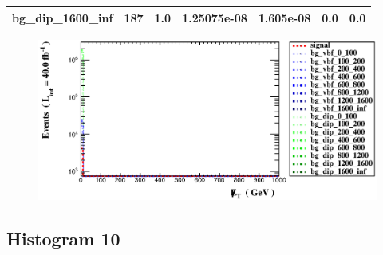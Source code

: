 \documentclass[a4paper, 10pt]{article}
\begin{document}
\begin{table}[H]
\begin{center}
\begin{tabular}{|m{23.0mm}|m{23.0mm}|m{18.0mm}|m{19.0mm}|m{19.0mm}|m{19.0mm}|m{19.0mm}|}
      \hline
      {\cellcolor{white}         bg\_dip\_1600\_inf}& {\cellcolor{white}         187}& {\cellcolor{white}         1.0}& {\cellcolor{white}         1.25075e-08}& {\cellcolor{white}         1.605e-08}& {\cellcolor{green}         0.0}& {\cellcolor{green}         0.0}\\
\hline
    \end{tabular}
  \end{center}
\end{table}

\begin{figure}[H]
  \begin{center}
    \includegraphics[scale=0.45]{selection_8.eps}\\
\caption{   }
  \end{center}
\end{figure}
      \newpage
\subsection{ Histogram 10}
\end{document}
